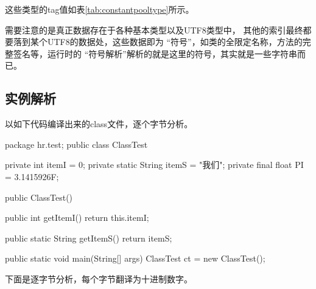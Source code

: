 这些类型的tag值如表\ref{tab:constantpooltype}所示。



需要注意的是真正数据存在于各种基本类型以及UTF8类型中，
其他的索引最终都要落到某个UTF8的数据处，这些数据即为
“符号”，如类的全限定名称，方法的完整签名等，运行时的
“符号解析”解析的就是这里的符号，其实就是一些字符串而已。

\subsection[实例解析]{实例解析}
以如下代码编译出来的class文件，逐个字节分析。

\begin{javacode}
package hr.test;
public class ClassTest {
  private int itemI = 0;
  private static String itemS = "我们";
  private final float PI = 3.1415926F;

  public ClassTest() { }

  public int getItemI() {
    return this.itemI;
  }

  public static String getItemS() {
    return itemS;
  }

  public static void main(String[] args) {
    ClassTest ct = new ClassTest();
  }
}
\end{javacode}

下面是逐字节分析，每个字节翻译为十进制数字。

%

